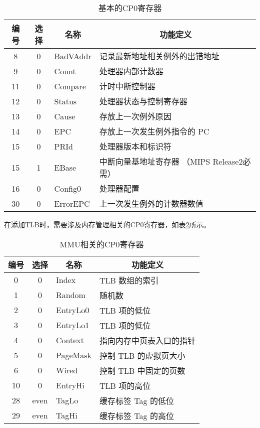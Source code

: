 \begin{table}[!htbp]
    \centering
    \caption{基本的CP0寄存器}
    \label{table:base_cp0}
    \begin{tabular}{ccll}
        \toprule
        \multicolumn{1}{c}{\textbf{编号}} & \multicolumn{1}{c}{\textbf{选择}} & \multicolumn{1}{c}{\textbf{名称}} & \multicolumn{1}{c}{\textbf{功能定义}} \\ 
    \midrule
    8   & 0 & BadVAddr  & 记录最新地址相关例外的出错地址 \\
    9   & 0 & Count     & 处理器内部计数器 \\
    11  & 0 & Compare   & 计时中断控制器 \\
    12  & 0 & Status    & 处理器状态与控制寄存器 \\
    13  & 0 & Cause     & 存放上一次例外原因 \\
    14  & 0 & EPC       & 存放上一次发生例外指令的 PC \\
    15  & 0 & PRId      & 处理器版本和标识符 \\
    15  & 1 & EBase     & 中断向量基地址寄存器 （MIPS Release2必需） \\
    16  & 0 & Config0   & 处理器配置 \\
    30  & 0 & ErrorEPC  & 上一次发生例外的计数器数值 \\
    \bottomrule
    \end{tabular}
\end{table}

在添加TLB时，需要涉及内存管理相关的CP0寄存器，如表\ref{table:mmu_cp0}所示。

\begin{table}[!htbp]
    \centering
    \caption{MMU相关的CP0寄存器}
    \label{table:mmu_cp0}
    \begin{tabular}{ccll}
    \toprule
    \multicolumn{1}{c}{\textbf{编号}} & \multicolumn{1}{c}{\textbf{选择}} & \multicolumn{1}{c}{\textbf{名称}} & \multicolumn{1}{c}{\textbf{功能定义}} \\ 
    \midrule
    0   & 0 & Index     & TLB 数组的索引 \\
    1   & 0 & Random    & 随机数 \\
    2   & 0 & EntryLo0  & TLB 项的低位 \\
    3   & 0 & EntryLo1  & TLB 项的低位 \\
    4   & 0 & Context   & 指向内存中页表入口的指针 \\
    5   & 0 & PageMask  & 控制 TLB 的虚拟页大小 \\
    6   & 0 & Wired     & 控制 TLB 中固定的页数 \\
    10  & 0 & EntryHi   & TLB 项的高位 \\
    28  & even  & TagLo & 缓存标签 Tag 的低位 \\
    29  & even  & TagHi & 缓存标签 Tag 的高位 \\
    \bottomrule
    \end{tabular}
\end{table}

